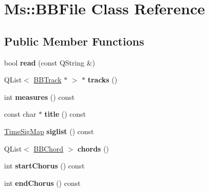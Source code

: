 \hypertarget{class_ms_1_1_b_b_file}{}\section{Ms\+:\+:B\+B\+File Class Reference}
\label{class_ms_1_1_b_b_file}
\subsection*{Public Member Functions}
\begin{DoxyCompactItemize}
\item 
\mbox{\label{class_ms_1_1_b_b_file_a3fd1191988d5f97742c4cf2769b23018}} 
bool {\bfseries read} (const Q\+String \&)
\item 
\mbox{\label{class_ms_1_1_b_b_file_a77b712338e945e0ca2695d77b7683df9}} 
Q\+List$<$ \hyperlink{class_ms_1_1_b_b_track}{B\+B\+Track} $\ast$ $>$ $\ast$ {\bfseries tracks} ()
\item 
\mbox{\label{class_ms_1_1_b_b_file_a9f3231fc2294f68a630611bdfaed3c09}} 
int {\bfseries measures} () const
\item 
\mbox{\label{class_ms_1_1_b_b_file_ac3fbd1f7155f70dd53aafe8c06157a2d}} 
const char $\ast$ {\bfseries title} () const
\item 
\mbox{\label{class_ms_1_1_b_b_file_aef17ac806310c708da978528b4c58ef4}} 
\hyperlink{class_ms_1_1_time_sig_map}{Time\+Sig\+Map} {\bfseries siglist} () const
\item 
\mbox{\label{class_ms_1_1_b_b_file_a283b53acbfcdd8e41bc3eaff3c71dc68}} 
Q\+List$<$ \hyperlink{struct_ms_1_1_b_b_chord}{B\+B\+Chord} $>$ {\bfseries chords} ()
\item 
\mbox{\label{class_ms_1_1_b_b_file_a84bb512a6318a0c0debc0c46817f99b1}} 
int {\bfseries start\+Chorus} () const
\item 
\mbox{\label{class_ms_1_1_b_b_file_a26aa1a43b20a130e6905649e69a5f2d2}} 
int {\bfseries end\+Chorus} () const
\item 

\end{DoxyCompactItemize}

